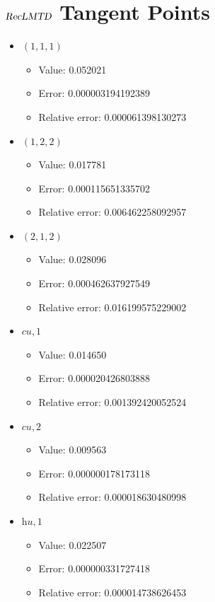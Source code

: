 \documentclass{article}%
\begin{document}
\section{$\textsl{RecLMTD}$ Tangent Points}%
\thispagestyle{plain}%
\begin{itemize}%
	\item $(1, 1, 1)$%
	\begin{itemize}%
		\item Value: 0.052021%
		\item Error: 0.000003194192389%
		\item Relative error: 0.000061398130273%
	\end{itemize}%
	\item $(1, 2, 2)$%
	\begin{itemize}%
		\item Value: 0.017781%
		\item Error: 0.000115651335702%
		\item Relative error: 0.006462258092957%
	\end{itemize}%
	\item $(2, 1, 2)$%
	\begin{itemize}%
		\item Value: 0.028096%
		\item Error: 0.000462637927549%
		\item Relative error: 0.016199575229002%
	\end{itemize}%
	\item $\textit{cu},1$%
	\begin{itemize}%
		\item Value: 0.014650%
		\item Error: 0.000020426803888%
		\item Relative error: 0.001392420052524%
	\end{itemize}%
	\item $\textit{cu},2$%
	\begin{itemize}%
		\item Value: 0.009563%
		\item Error: 0.000000178173118%
		\item Relative error: 0.000018630480998%
	\end{itemize}%
	\item $\textit{hu},1$%
	\begin{itemize}%
		\item Value: 0.022507%
		\item Error: 0.000000331727418%
		\item Relative error: 0.000014738626453%
	\end{itemize}%
\end{itemize}%
\end{document}
